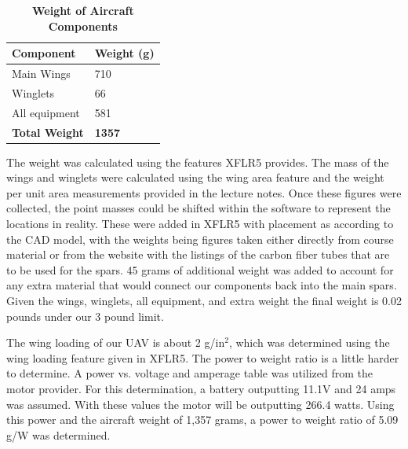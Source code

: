     \begin{table}[H]
        \begin{center}
        \caption{\textbf{Weight of Aircraft Components}} \label{table:Weights}
        \begin{tabular}{|p{1in}|p{1in}|} %
        \hline
            \textbf{Component} & \textbf{Weight (g)} \\ \hline
            Main Wings & 710 \\ \hline
            Winglets & 66 \\ \hline
            All equipment & 581 \\ \hline
            \textbf{Total Weight} & \textbf{1357} \\ \hline
        \end{tabular}
        \end{center}
    \end{table}

    The weight was calculated using the features XFLR5 provides. The mass of the wings and winglets were calculated using the wing area feature and the weight per unit area measurements provided in the lecture notes. Once these figures were collected, the point masses could be shifted within the software to represent the locations in reality. These were added in XFLR5 with placement as according to the CAD model, with the weights being figures taken either directly from course material or from the website with the listings of the carbon fiber tubes that are to be used for the spars. 45 grams of additional weight was added to account for any extra material that would connect our components back into the main spars. Given the wings, winglets, all equipment, and extra weight the final weight is 0.02 pounds under our 3 pound limit. 
    
    The wing loading of our UAV is about 2 g/in$^2$, which was determined using the wing loading feature given in XFLR5. The power to weight ratio is a little harder to determine. A power vs. voltage and amperage table was utilized from the motor provider. For this determination, a battery outputting 11.1V and 24 amps was assumed. With these values the motor will be outputting 266.4 watts. Using this power and the aircraft weight of 1,357 grams, a power to weight ratio of 5.09 g/W was determined.



